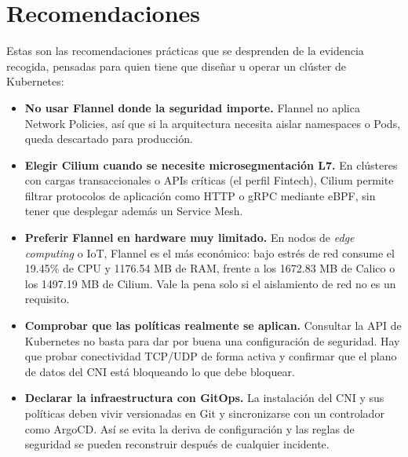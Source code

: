 \chapter{Recomendaciones} \label{sec:Recomendaciones}

Estas son las recomendaciones prácticas que se desprenden de la evidencia recogida, pensadas para quien tiene que diseñar u operar un clúster de Kubernetes:

\begin{itemize}
    \item \textbf{No usar Flannel donde la seguridad importe.} Flannel no aplica Network Policies, así que si la arquitectura necesita aislar namespaces o Pods, queda descartado para producción.

    \item \textbf{Elegir Cilium cuando se necesite microsegmentación L7.} En clústeres con cargas transaccionales o APIs críticas (el perfil Fintech), Cilium permite filtrar protocolos de aplicación como HTTP o gRPC mediante eBPF, sin tener que desplegar además un Service Mesh.

    \item \textbf{Preferir Flannel en hardware muy limitado.} En nodos de \emph{edge computing} o IoT, Flannel es el más económico: bajo estrés de red consume el 19.45\% de CPU y 1176.54 MB de RAM, frente a los 1672.83 MB de Calico o los 1497.19 MB de Cilium. Vale la pena solo si el aislamiento de red no es un requisito.

    \item \textbf{Comprobar que las políticas realmente se aplican.} Consultar la API de Kubernetes no basta para dar por buena una configuración de seguridad. Hay que probar conectividad TCP/UDP de forma activa y confirmar que el plano de datos del CNI está bloqueando lo que debe bloquear.

    \item \textbf{Declarar la infraestructura con GitOps.} La instalación del CNI y sus políticas deben vivir versionadas en Git y sincronizarse con un controlador como ArgoCD. Así se evita la deriva de configuración y las reglas de seguridad se pueden reconstruir después de cualquier incidente.
\end{itemize}
